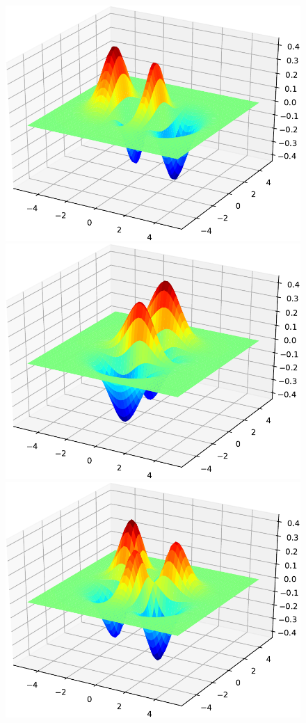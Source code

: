 \begin{figure}[H]
{\includegraphics[scale=0.3]{../codes/sch_2d/IMG_harmonic_psi_7.pdf}%
\includegraphics[scale=0.3]{../codes/sch_2d/IMG_harmonic_psi_8.pdf}%
\includegraphics[scale=0.3]{../codes/sch_2d/IMG_harmonic_psi_9.pdf}%
}
\end{figure}
